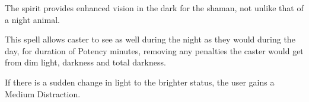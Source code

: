 \documentclass[11pt,a4paper,twocolumn]{book}
\begin{document}
\medskip

The spirit provides enhanced vision in the dark for the shaman, not unlike that of a night animal.

This spell allows caster to see as well during the night as they would during the day, for duration of Potency minutes, removing any penalties the caster would get from dim light, darkness and total darkness. 

If there is a sudden change in light to the brighter status, the user gains a Medium Distraction.

%	
%
%
%
\end{document}
